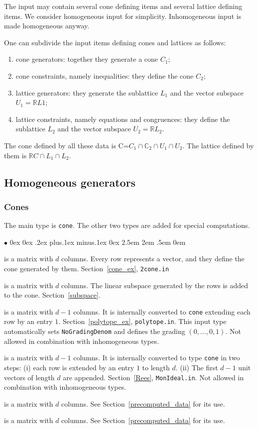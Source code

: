 \documentclass[12pt,a4paper]{scrartcl}
\newcommand{\stdli}{ \topsep0ex \partopsep0ex %
\parsep.2ex plus.1ex minus.1ex \itemsep0ex%
\leftmargin2.5em \labelwidth2em \labelsep.5em \rightmargin0em}%
\renewenvironment{itemize}{\begin{list}{{$\bullet$}}{\stdli}}{\end{list}}
\theoremstyle{definition}
\def\CC{{\mathbb C}}
\def\RR{{\mathbb R}}
\def\itemtt[#1]{\item[\textbf{\ttt{#1}}]}
\def\ttt{\texttt}
\begin{document}
The input may contain several cone defining items and several lattice defining items. We consider homogeneous input for simplicity. Inhomogeneous input is made homogeneous anyway.

One can subdivide the input items defining cones and lattices as follows:
\begin{enumerate}
	\item cone generators: together they generate a cone $C_1$;
	\item cone constraints, namely inequalities: they define the cone $C_2$;
	\item lattice generators: they generate the sublattice $L_1$ and the vector subspace $U_1=\RR L1$;
	\item lattice constraints, namely equations and congruences: they define the sublattice $L_2$ and the vector subspace $U_2=\RR L_2$.
\end{enumerate}

The cone defined by all these data is C=$C_1\cap\CC_2\cap U_1\cap U_2$. The lattice defined by them is $\RR C\cap L_1\cap L_2$.

\subsection{Homogeneous generators}

\subsubsection{Cones}\label{cone_synt}

The main type is \verb|cone|. The other two types are added for special computations.

\begin{itemize}
	\itemtt[cone] is a matrix with $d$ columns. Every row represents a vector, and they define the cone generated by them. Section~\ref{cone_ex}, \verb|2cone.in|
	
	\itemtt[subspace] is a matrix with $d$ columns. The linear subspace generated by the rows is added to the cone. Section~\ref{subspace}.
	
	\itemtt[polytope] is a matrix with $d-1$ columns. It is internally converted to \verb|cone| extending each row by an entry $1$. Section~\ref{polytope_ex}, \verb|polytope.in|. This input type automatically sets \verb|NoGradingDenom| and defines the grading $(0,\dots,0,1)$. Not allowed in combination with inhomogeneous types.
	
	\itemtt[rees\_algebra] is a matrix with $d-1$ columns. It is internally converted to type \verb|cone| in two steps: (i) each row is extended by an entry $1$ to length $d$. (ii) The first $d-1$ unit vectors of length $d$ are appended. Section~\ref{Rees}, \verb|MonIdeal.in|. Not allowed in combination with inhomogeneous types.
	
	\itemtt[extreme\_rays] is a matrix with $d$ columns. See Section~\ref{precomputed_data} for its use.
	
	\itemtt[maximal\_subspace] is a matrix with $d$ columns. See Section~\ref{precomputed_data} for its use.
\end{itemize}
\end{document}
